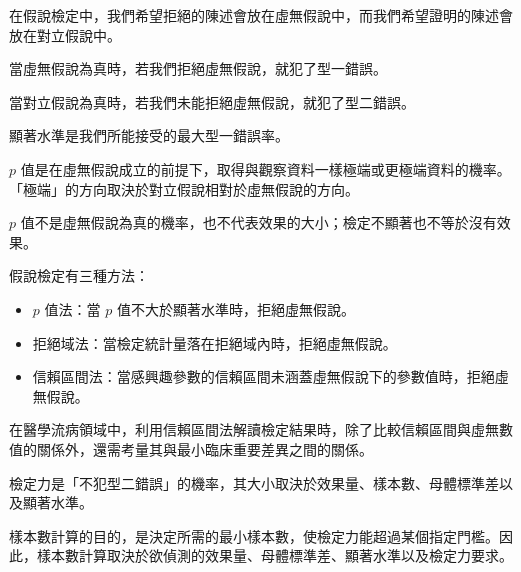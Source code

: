     \begin{takehome}
        \item 在假說檢定中，我們希望拒絕的陳述會放在虛無假說中，而我們希望證明的陳述會放在對立假說中。
        \item 當虛無假說為真時，若我們拒絕虛無假說，就犯了型一錯誤。
        \item 當對立假說為真時，若我們未能拒絕虛無假說，就犯了型二錯誤。
        \item 顯著水準是我們所能接受的最大型一錯誤率。
        \item $p$ 值是在虛無假說成立的前提下，取得與觀察資料一樣極端或更極端資料的機率。「極端」的方向取決於對立假說相對於虛無假說的方向。
        \item $p$ 值不是虛無假說為真的機率，也不代表效果的大小；檢定不顯著也不等於沒有效果。
        \item 假說檢定有三種方法：
        \begin{itemize}
            \item $p$ 值法：當 $p$ 值不大於顯著水準時，拒絕虛無假說。       \item 拒絕域法：當檢定統計量落在拒絕域內時，拒絕虛無假說。       \item 信賴區間法：當感興趣參數的信賴區間未涵蓋虛無假說下的參數值時，拒絕虛無假說。
        \end{itemize}
        \item 在醫學流病領域中，利用信賴區間法解讀檢定結果時，除了比較信賴區間與虛無數值的關係外，還需考量其與最小臨床重要差異之間的關係。
        \item 檢定力是「不犯型二錯誤」的機率，其大小取決於效果量、樣本數、母體標準差以及顯著水準。
        \item 樣本數計算的目的，是決定所需的最小樣本數，使檢定力能超過某個指定門檻。因此，樣本數計算取決於欲偵測的效果量、母體標準差、顯著水準以及檢定力要求。
    \end{takehome}

